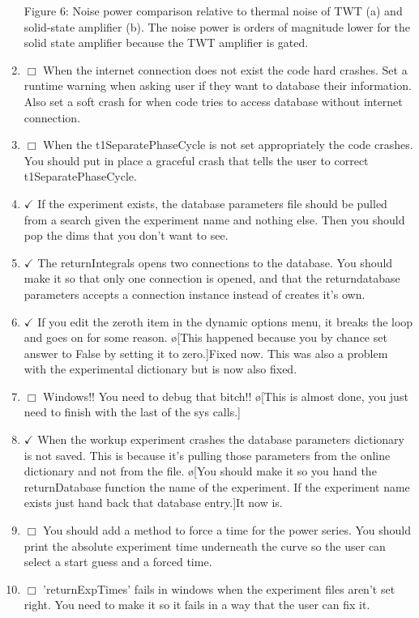 \documentclass[10pt]{book}
\begin{document}
\begin{enumerate}
Figure 6: Noise power comparison relative to thermal noise of TWT (a) and solid-state amplifier (b). The noise power is orders of magnitude lower for the solid state amplifier because the TWT amplifier is gated.
    \item $\Box$ When the internet connection does not exist the code hard crashes. Set a runtime warning when asking user if they want to database their information. Also set a soft crash for when code tries to access database without internet connection.
    \item $\Box$ When the t1SeparatePhaseCycle is not set appropriately the code crashes. You should put in place a graceful crash that tells the user to correct t1SeparatePhaseCycle.
    \item $\checkmark$ If the experiment exists, the database parameters file should be pulled from a search given the experiment name and nothing else. Then you should pop the dims that you don't want to see. 
    \item $\checkmark$ The returnIntegrals opens two connections to the database. You should make it so that only one connection is opened, and that the returndatabase parameters accepts a connection instance instead of creates it's own.
    \item $\checkmark$ If you edit the zeroth item in the dynamic options menu, it breaks the loop and goes on for some reason. \o[This happened because you by chance set answer to False by setting it to zero.]{Fixed now. This was also a problem with the experimental dictionary but is now also fixed.} 
    \item $\Box$ Windows!! You need to debug that bitch!! \o[This is almost done, you just need to finish with the last of the sys calls.]{}
    \item $\checkmark$ When the workup experiment crashes the database parameters dictionary is not saved. This is because it's pulling those parameters from the online dictionary and not from the file. \o[You should make it so you hand the returnDatabase function the name of the experiment. If the experiment name exists just hand back that database entry.]{It now is.}
    \item $\Box$ You should add a method to force a time for the power series. You should print the absolute experiment time underneath the curve so the user can select a start guess and a forced time.
    \item $\Box$ 'returnExpTimes' fails in windows when the experiment files aren't set right. You need to make it so it fails in a way that the user can fix it.

\end{enumerate}
\end{document}
